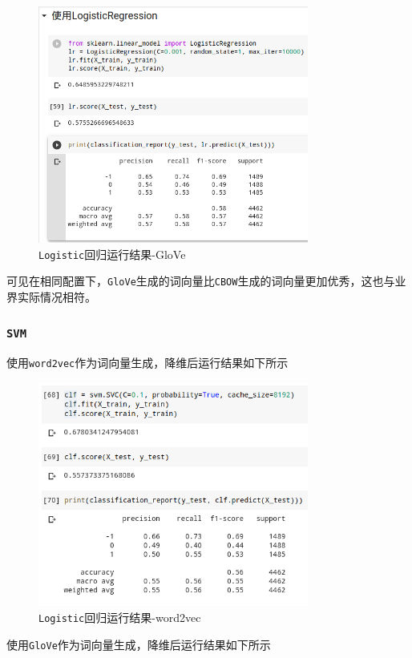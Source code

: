 \documentclass[UTF8]{ctexart}
\begin{document}
\begin{figure}[htb]
    \centering
    \includegraphics[width=3.5in]{asset/Logistic_glove.png}
    \caption{\lstinline{Logistic}回归运行结果-GloVe} 
\end{figure}

可见在相同配置下，\lstinline{GloVe}生成的词向量比\lstinline{CBOW}生成的词向量更加优秀，这也与业界实际情况相符。

\newpage
\subsubsection{\lstinline{SVM}}

使用\lstinline{word2vec}作为词向量生成，降维后运行结果如下所示
\begin{figure}[htb]
    \centering
    \includegraphics[width=3.5in]{asset/SVM_word2vec.png}
    \caption{\lstinline{Logistic}回归运行结果-word2vec} 
\end{figure}

使用\lstinline{GloVe}作为词向量生成，降维后运行结果如下所示
\end{document}

